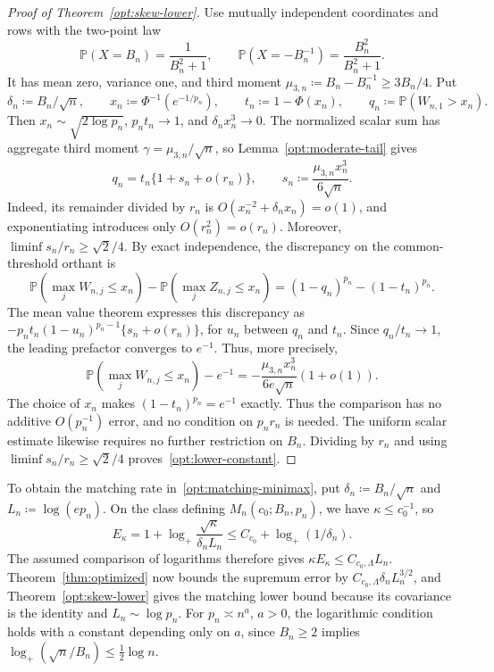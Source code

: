 \documentclass[11pt,letterpaper]{article}
\theoremstyle{remark}
\newcommand{\Pp}{\mathbb P}
\begin{document}
\begin{proof}[Proof of Theorem~\ref{opt:skew-lower}]
Use mutually independent coordinates and rows with the two-point law
\begin{equation}
 \Pp(X=B_n)=\frac1{B_n^2+1},\qquad
 \Pp(X=-B_n^{-1})=\frac{B_n^2}{B_n^2+1}.
 \label{opt:two-point-law}
\end{equation}
It has mean zero, variance one, and third moment
\(\mu_{3,n}\coloneqq B_n-B_n^{-1}\ge3B_n/4\). Put
\[
 \delta_n\coloneqq B_n/\sqrt n,\qquad
 x_n\coloneqq\Phi^{-1}(e^{-1/p_n}),\qquad
 t_n\coloneqq1-\Phi(x_n),\qquad q_n\coloneqq\Pp(W_{n,1}>x_n).
\]
Then \(x_n\sim\sqrt{2\log p_n}\), \(p_nt_n\to1\), and
\(\delta_nx_n^3\to0\). The normalized scalar sum has aggregate
third moment \(\gamma=\mu_{3,n}/\sqrt n\), so
Lemma~\ref{opt:moderate-tail} gives
\begin{equation}
 q_n=t_n\{1+s_n+o(r_n)\},\qquad
 s_n\coloneqq\frac{\mu_{3,n}x_n^3}{6\sqrt n}.
 \label{opt:tail-linearization}
\end{equation}
Indeed, its remainder divided by \(r_n\) is
\(O(x_n^{-2}+\delta_nx_n)=o(1)\), and exponentiating introduces only
\(O(r_n^2)=o(r_n)\). Moreover,
\(\liminf s_n/r_n\ge\sqrt2/4\).
By exact independence, the discrepancy on the common-threshold orthant is
\[
 \Pp(\max_jW_{n,j}\le x_n)-\Pp(\max_jZ_{n,j}\le x_n)
 =(1-q_n)^{p_n}-(1-t_n)^{p_n}.
\]
The mean value theorem expresses this discrepancy as
\(-p_nt_n(1-u_n)^{p_n-1}\{s_n+o(r_n)\}\), for \(u_n\) between
\(q_n\) and \(t_n\). Since \(q_n/t_n\to1\), the leading prefactor
converges to \(e^{-1}\). Thus, more precisely,
\begin{equation}
 \Pp(\max_jW_{n,j}\le x_n)-e^{-1}
 =-\frac{\mu_{3,n}x_n^3}{6e\sqrt n}(1+o(1)).
 \label{opt:exact-product-asymptotic}
\end{equation}
The choice of \(x_n\) makes \((1-t_n)^{p_n}=e^{-1}\) exactly.
Thus the comparison has no additive \(O(p_n^{-1})\) error, and no
condition on \(p_nr_n\) is needed. The uniform scalar estimate likewise
requires no further restriction on \(B_n\). Dividing by \(r_n\) and
using \(\liminf s_n/r_n\ge\sqrt2/4\) proves~\eqref{opt:lower-constant}.
\end{proof}

To obtain the matching rate in~\eqref{opt:matching-minimax}, put
\(\delta_n\coloneqq B_n/\sqrt n\) and \(L_n\coloneqq\log(ep_n)\).
On the class defining \(M_n(c_0;B_n,p_n)\), we have
\(\kappa\le c_0^{-1}\), so
\[
 E_\kappa=1+\log_+\frac{\sqrt\kappa}{\delta_nL_n}
 \le C_{c_0}+\log_+(1/\delta_n).
\]
The assumed comparison of logarithms therefore gives
\(\kappa E_\kappa\le C_{c_0,\Lambda}L_n\). Theorem~\ref{thm:optimized}
now bounds the supremum error by
\(C_{c_0,\Lambda}\delta_nL_n^{3/2}\), and
Theorem~\ref{opt:skew-lower} gives the matching lower bound because
its covariance is the identity and \(L_n\sim\log p_n\).
For \(p_n\asymp n^a\), \(a>0\), the logarithmic condition holds with
a constant depending only on \(a\), since \(B_n\ge2\) implies
\(\log_+(\sqrt n/B_n)\le\tfrac12\log n\).
\end{document}
